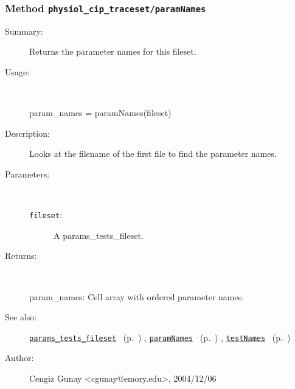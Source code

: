 \subsubsection[Method \texttt{paramNames}]{Method \texttt{physiol\_cip\_traceset/paramNames}}%
%
\label{ref_physiol_cip_traceset__paramNames}%
\hypertarget{ref_physiol_cip_traceset__paramNames}{}%
\begin{description}
\item[Summary:]Returns the parameter names for this fileset.
%
\item[Usage:]~%
\begin{lyxcode}%
param\_names = paramNames(fileset)
%
\end{lyxcode}%
%
\item[Description:]%
Looks at the filename of the first file to find the parameter names.
\item[Parameters:]~
\begin{description}%
\item[\texttt{fileset}:]
 A params\_tests\_fileset.
\end{description}%
%
\item[Returns:]~

	param\_names: Cell array with ordered parameter names.
%
%
\item[See also:]%
\hyperlink{ref_params_tests_fileset}{\texttt{params\_tests\_fileset}}%
\ (p.~\pageref{ref_params_tests_fileset})%
%
, \hyperlink{ref_paramNames}{\texttt{paramNames}}%
\ (p.~\pageref{ref_paramNames})%
%
, \hyperlink{ref_testNames}{\texttt{testNames}}%
\ (p.~\pageref{ref_testNames})%
%
%
\item[Author:]%
Cengiz Gunay <cgunay@emory.edu>, 2004/12/06%
\end{description}
\methodline%
